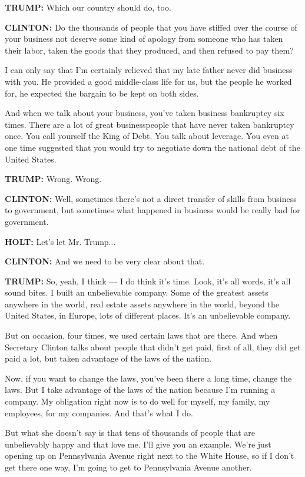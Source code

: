 \textbf{TRUMP:} Which our country should do, too.

\textbf{CLINTON:} Do the thousands of people that you have stiffed over
the course of your business not deserve some kind of apology from
someone who has taken their labor, taken the goods that they produced,
and then refused to pay them?

I can only say that I'm certainly relieved that my late father never did
business with you. He provided a good middle-class life for us, but the
people he worked for, he expected the bargain to be kept on both sides.

And when we talk about your business, you've taken business bankruptcy
six times. There are a lot of great businesspeople that have never taken
bankruptcy once. You call yourself the King of Debt. You talk about
leverage. You even at one time suggested that you would try to negotiate
down the national debt of the United States.

\textbf{TRUMP:} Wrong. Wrong.

\textbf{CLINTON:} Well, sometimes there's not a direct transfer of
skills from business to government, but sometimes what happened in
business would be really bad for government.

\textbf{HOLT:} Let's let Mr. Trump...

\textbf{CLINTON:} And we need to be very clear about that.

\textbf{TRUMP:} So, yeah, I think --- I do think it's time. Look, it's
all words, it's all sound bites. I built an unbelievable company. Some
of the greatest assets anywhere in the world, real estate assets
anywhere in the world, beyond the United States, in Europe, lots of
different places. It's an unbelievable company.

But on occasion, four times, we used certain laws that are there. And
when Secretary Clinton talks about people that didn't get paid, first of
all, they did get paid a lot, but taken advantage of the laws of the
nation.

Now, if you want to change the laws, you've been there a long time,
change the laws. But I take advantage of the laws of the nation because
I'm running a company. My obligation right now is to do well for myself,
my family, my employees, for my companies. And that's what I do.

But what she doesn't say is that tens of thousands of people that are
unbelievably happy and that love me. I'll give you an example. We're
just opening up on Pennsylvania Avenue right next to the White House, so
if I don't get there one way, I'm going to get to Pennsylvania Avenue
another.

